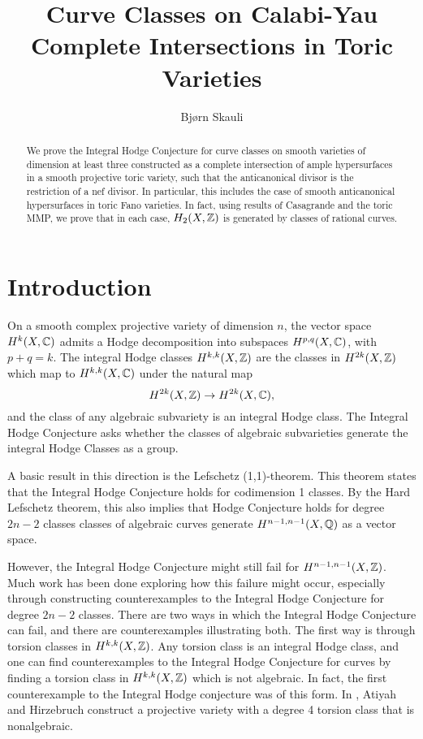\title{Curve Classes on Calabi-Yau Complete Intersections in Toric Varieties}
\author{Bjørn Skauli}
%
\maketitle
\label{pap:integralhodge}
\begin{abstract}
  We prove the Integral Hodge Conjecture for curve classes on smooth varieties of dimension at least three constructed as a complete intersection of ample hypersurfaces in a smooth projective toric variety, such that the anticanonical divisor is the restriction of a nef divisor. In particular, this includes the case of smooth anticanonical hypersurfaces in toric Fano varieties. In fact, using results of Casagrande and the toric MMP, we prove that in each case, $H_2(X,\mathbb{Z})$ is generated by classes of rational curves.
\end{abstract}

\section{Introduction}
On a smooth complex projective variety of dimension $n$, the vector space $H^k(X,\mathbb{C})$ admits a Hodge decomposition into subspaces $H^{p,q}(X,\mathbb{C})$, with $p+q = k$. The integral Hodge classes $H^{k,k}(X,\mathbb{Z})$ are the classes in  $H^{2k}(X,\mathbb{Z})$ which map to $H^{k,k}(X,\mathbb{C})$ under the natural map
\[H^{2k}(X,\mathbb{Z}) \to H^{2k}(X,\mathbb{C}),\]
 and the class of any algebraic subvariety is an integral Hodge class. The Integral Hodge Conjecture asks whether the classes of algebraic subvarieties generate the integral Hodge Classes as a group.

A basic result in this direction is the Lefschetz (1,1)-theorem. This theorem states that the Integral Hodge Conjecture holds for codimension 1 classes. By the Hard Lefschetz theorem, this also implies that  Hodge Conjecture holds for degree $2n-2$ classes \ie classes of algebraic curves generate $H^{n-1,n-1}(X,\mathbb{Q})$ as a vector space. 

However, the Integral Hodge Conjecture might still fail for $H^{n-1,n-1}(X,\mathbb{Z})$. Much work has been done exploring how this failure might occur, especially through constructing counterexamples to the Integral Hodge Conjecture for degree $2n-2$ classes. There are two ways in which the Integral Hodge Conjecture can fail, and there are counterexamples illustrating both. The first way is through torsion classes in $H^{k,k}(X,\mathbb{Z})$. Any torsion class is an integral Hodge class, and one can find counterexamples to the Integral Hodge Conjecture for curves by finding a torsion class in $H^{k,k}(X,\mathbb{Z})$ which is not algebraic. In fact, the first counterexample to the Integral Hodge conjecture was of this form. In \cite{AtiyahHirzebruch}, Atiyah and Hirzebruch construct a projective variety with a degree 4 torsion class that is nonalgebraic.

